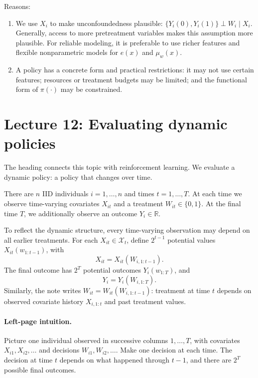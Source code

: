 Reasons:
\begin{enumerate}
 \item We use $X_i$ to make unconfoundedness plausible:
 $\{Y_i(0),Y_i(1)\}\perp W_i\mid X_i$. Generally, access to more pretreatment variables makes this assumption more plausible. For reliable modeling, it is preferable to use richer features and flexible nonparametric models for $e(x)$ and $\mu_w(x)$.
 \item A policy has a concrete form and practical restrictions: it may not use certain features; resources or treatment budgets may be limited; and the functional form of $\pi(\cdot)$ may be constrained.
\end{enumerate}

\section{Lecture 12: Evaluating dynamic policies}
The heading connects this topic with reinforcement learning. We evaluate a dynamic policy: a policy that changes over time.

There are $n$ IID individuals $i=1,\ldots,n$ and times $t=1,\ldots,T$. At each time we observe time-varying covariates $X_{it}$ and a treatment $W_{it}\in\{0,1\}$. At the final time $T$, we additionally observe an outcome $Y_i\in\mathbb R$.

To reflect the dynamic structure, every time-varying observation may depend on all earlier treatments. For each $X_{it}\in\mathcal X_t$, define $2^{t-1}$ potential values $X_{it}(w_{1:t-1})$, with
\[
 X_{it}=X_{it}(W_{i,1:t-1}).
\]
The final outcome has $2^T$ potential outcomes $Y_i(w_{1:T})$, and
\[
 Y_i=Y_i(W_{i,1:T}).
\]
Similarly, the note writes $W_{it}=W_{it}(W_{i,1:t-1})$: treatment at time $t$ depends on observed covariate history $X_{i,1:t}$ and past treatment values.

\paragraph{Left-page intuition.}
Picture one individual observed in successive columns $1,\ldots,T$, with covariates $X_{i1},X_{i2},\ldots$ and decisions $W_{i1},W_{i2},\ldots$. Make one decision at each time. The decision at time $t$ depends on what happened through $t-1$, and there are $2^T$ possible final outcomes.

